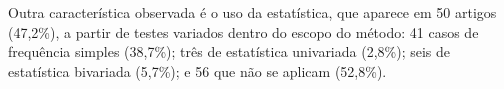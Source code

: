 {

Outra característica observada é o uso da estatística, que aparece em 50
artigos (47,2\%), a partir de testes variados dentro do escopo do
método: 41 casos de frequência simples (38,7\%); três de estatística univariada (2,8\%); seis de estatística bivariada (5,7\%); e 56 que não se aplicam (52,8\%).

}
